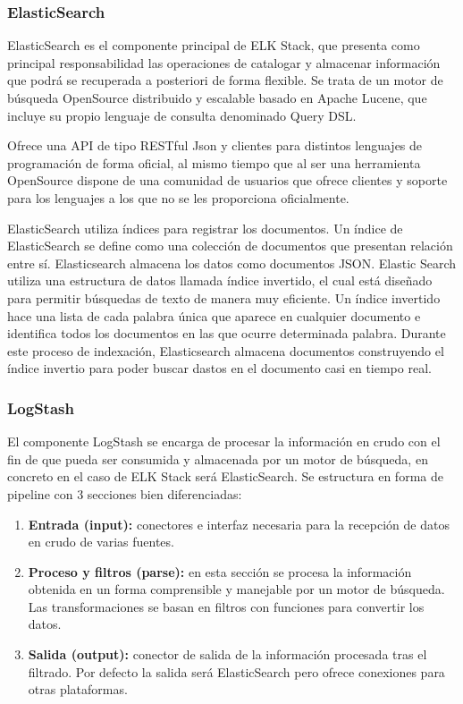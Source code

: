 \subsubsection{ElasticSearch}

ElasticSearch es el componente principal de ELK Stack, que presenta como principal responsabilidad las operaciones de catalogar y almacenar información que podrá se recuperada a posteriori de forma flexible. Se trata de un motor de búsqueda OpenSource distribuido y escalable basado en Apache Lucene, que incluye su propio lenguaje de consulta denominado Query DSL. 

Ofrece una API de tipo RESTful Json y clientes para distintos lenguajes de programación de forma oficial, al mismo tiempo que al ser una herramienta OpenSource dispone de una comunidad de usuarios que ofrece clientes y soporte para los lenguajes a los que no se les proporciona oficialmente.

ElasticSearch utiliza índices para registrar los documentos. Un índice de ElasticSearch se define como una colección de documentos que presentan relación entre sí. Elasticsearch almacena los datos como documentos JSON. Elastic Search utiliza una estructura de datos llamada índice invertido, el cual está diseñado para permitir búsquedas de texto de manera muy eficiente. Un índice invertido hace una lista de cada palabra única que aparece en cualquier documento e identifica todos los documentos en las que ocurre determinada palabra. Durante este proceso de indexación, Elasticsearch almacena documentos construyendo el índice invertio para poder buscar dastos en el documento casi en tiempo real.



\subsubsection{LogStash}

El componente LogStash  se encarga de procesar la información en crudo con el fin de que pueda ser consumida y almacenada por un motor de búsqueda, en concreto en el caso de ELK Stack será ElasticSearch. Se estructura en forma de pipeline con 3 secciones bien diferenciadas:

\begin{enumerate}
\item \textbf{Entrada (input):} conectores e interfaz necesaria para la recepción de datos en crudo de varias fuentes.
\item \textbf{Proceso y filtros (parse):} en esta sección se procesa la información obtenida en un forma comprensible y manejable por un motor de búsqueda. Las transformaciones se basan en filtros con funciones para convertir los datos.
\item \textbf{Salida (output):} conector de salida de la información procesada tras el filtrado. Por defecto la salida será ElasticSearch pero ofrece conexiones para otras plataformas.
\end{enumerate}

